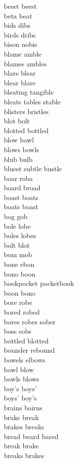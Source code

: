 beset beest\\
beta beat\\
bids dibs\\
birds dribs\\
bison nobis\\
blame amble\\
blames ambles\\
blare blear\\
blear blare\\
bleating tangible\\
bleats tables stable\\
blisters bristles\\
blot bolt\\
blotted bottled\\
blow bowl\\
blows bowls\\
blub bulb\\
bluest subtle bustle\\
boar roba\\
board broad\\
boast boats\\
boats boast\\
bog gob\\
bole lobe\\
boles lobes\\
bolt blot\\
bom mob\\
bone ebon\\
bono boon\\
bookpocket pocketbook\\
boon bono\\
bore robe\\
bored robed\\
bores robes sober\\
boss sobs\\
bottled blotted\\
bounder rebound\\
bowels elbows\\
bowl blow\\
bowls blows\\
boy's boys'\\
boys' boy's\\
brains bairns\\
brake break\\
brakes breaks\\
bread beard bared\\
break brake\\
breaks brakes\\
